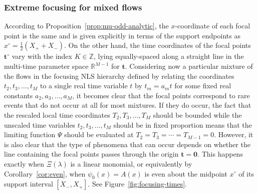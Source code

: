 \documentclass[12pt]{amsart}
\numberwithin{equation}{section}
\newcommand{\SP}{\lambda}
\newcommand{\tailint}{\Xi}
\begin{document}
\subsubsection{Extreme focusing for mixed flows}
According to Proposition~\ref{prop:mu-odd-analytic}, the $x$-coordinate of each focal point is the same and is given explicitly in terms of the support endpoints as $x^\circ = \frac{1}{2}(X_++X_-)$.  On the other hand, the time coordinates of the focal points $\mathbf{t}^\circ$ vary with the index $K\in\mathbb{Z}$, lying equally-spaced along a straight line in the multi-time parameter space $\mathbb{R}^{M-1}$ for $\mathbf{t}$.  Considering now a particular mixture of the flows in the focusing NLS hierarchy defined by relating the coordinates $t_2,t_3,\dots,t_M$ to a single real time variable $t$ by $t_m=a_mt$ for some fixed real constants $a_2,a_3,\dots,a_M$, it becomes clear that the focal points correspond to rare events that do not occur at all for most mixtures.  If they do occur, the fact that the rescaled local time coordinates $T_2,T_3,\dots,T_M$ should be bounded while the unscaled time variables $t_2,t_3,\dots,t_M$ should be in fixed proportion means that the limiting function $\Psi$ should be evaluated at $T_2=T_3=\cdots=T_{M-1}=0$.  However, it is also clear that the type of phenomena that can occur depends on whether the line containing the focal points passes through the origin $\mathbf{t}=\mathbf{0}$.  This happens exactly when $\tailint(\SP)$ is a linear monomial, or equivalently by Corollary~\ref{cor:even}, when $\psi_0(x)=A(x)$ is even about the midpoint $x^\circ$ of its support interval $[X_-,X_+]$.  See Figure~\ref{fig:focusing-times}.  
\end{document}
